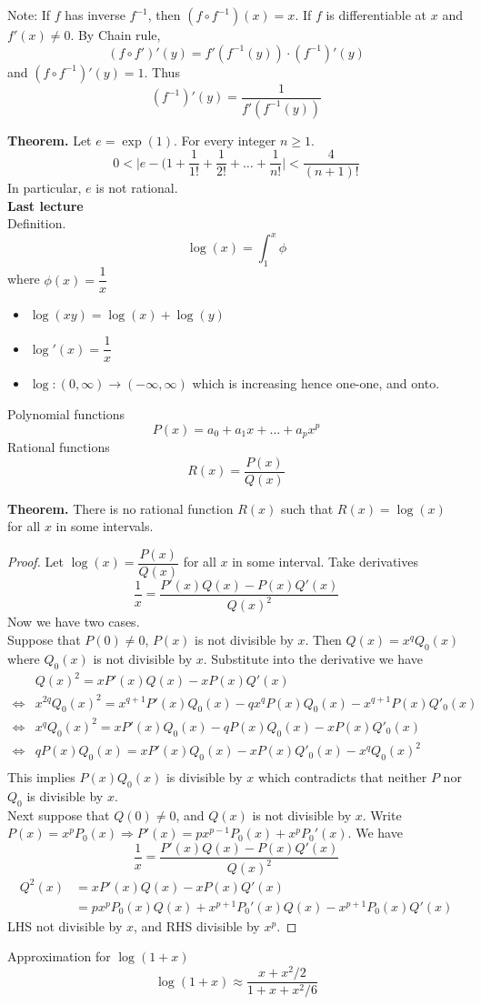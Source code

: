 \documentclass[10pt,letterpaper]{article}
\begin{document}
	Note: If $f$ has inverse $f^{-1}$, then $(f \circ f^{-1})(x) = x$. If $f$ is differentiable
	at $x$ and $f'(x) \neq 0$. By Chain rule,
	$$(f \circ f')'(y) = f'(f^{-1}(y)) \cdot (f^{-1})'(y)$$
	and $(f \circ f^{-1})'(y) = 1$. Thus
	$$(f^{-1})'(y) = \dfrac{1}{f'(f^{-1}(y))}$$

	\textbf{Theorem. } Let $e = \exp(1)$.  For every integer $n \geq 1$.
	$$0 < \bigg|e - (1 + \dfrac{1}{1!} + \dfrac{1}{2!} + \ldots + \dfrac{1}{n!} \bigg| < \dfrac{4}{(n + 1)!}$$
	In particular, $e$ is not rational.\\
	
	{\color{blue}\textbf{Last lecture}} \\
	Definition. 
	$$\log(x) = \displaystyle\int_{1}^{x} \phi$$
	where $\phi(x) = \dfrac{1}{x}$
	\begin{itemize}
		\item $\log(xy) = \log(x) + \log(y)$
		\item $\log'(x) = \dfrac{1}{x}$
		\item $\log : (0, \infty) \rightarrow (-\infty, \infty)$ which is increasing 
		hence one-one, and onto.	
	\end{itemize}	 
	Polynomial functions $$P(x) = a_0 + a_1x + \ldots + a_px^p$$
	Rational functions $$R(x) = \dfrac{P(x)}{Q(x)}$$
	
	\textbf{Theorem. } There is no rational function $R(x)$ such that 
	$R(x) = \log(x)$ for all $x$ in some intervals. 
	\begin{proof}
	Let $\log(x) = \dfrac{P(x)}{Q(x)}$ for all $x$ in some interval.
	Take derivatives 
	$$\dfrac{1}{x} = \dfrac{P'(x)Q(x) - P(x)Q'(x)}{Q(x)^2}$$
	Now we have two cases. \\
	Suppose that $P(0) \neq 0$, $P(x)$ is not divisible by $x$. Then
	$Q(x) = x^q Q_0(x)$ where $Q_0(x)$ is not divisible by $x$. 
	Substitute into the derivative we have
\begin{align*}
	& Q(x)^2 = xP'(x)Q(x) - xP(x)Q'(x) \\
\Leftrightarrow & x^{2q}Q_0(x)^2 = x^{q+1}P'(x)Q_0(x) - qx^qP(x)Q_0(x) - x^{q+1}P(x)Q'_0(x) \\
\Leftrightarrow & 
x^qQ_0(x)^2 = xP'(x)Q_0(x) - qP(x)Q_0(x) - xP(x)Q'_0(x) \\
\Leftrightarrow & 
	qP(x)Q_0(x) = xP'(x)Q_0(x) - xP(x)Q'_0(x) - x^qQ_0(x)^2 \\
\end{align*}
	This implies $P(x)Q_0(x)$ is divisible by $x$ which contradicts that
	 neither $P$ nor $Q_0$ is divisible by  $x$. \\
	 Next suppose that $Q(0) \neq 0$, and $Q(x)$ is not divisible by $x$.
	 Write $P(x) = x^p P_0(x) \Rightarrow P'(x)
	 = px^{p-1}P_0(x) + x^pP_0'(x)$. We have
	 $$\dfrac{1}{x} = \dfrac{P'(x)Q(x) - P(x)Q'(x)}{Q(x)^2}$$
\begin{align*}
	Q^2(x) &= xP'(x)Q(x) - xP(x)Q'(x) \\
	&= px^pP_0(x)Q(x) + x^{p+1}P_0'(x)Q(x) - x^{p+1}P_0(x)Q'(x)
\end{align*}
	LHS not divisible by $x$, and RHS divisible by $x^p$.		
	\end{proof}	 
	Approximation for $\log(1 + x)$
	$$\log(1 + x) \approx \dfrac{x + x^2/2}{1 + x + x^2/6}$$
	
\end{document}
